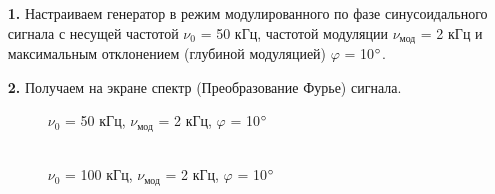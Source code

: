 \documentclass[a4paper,12pt]{article}
\begin{document}
\begin{enumerate}


\item [\textbf{1.}] Настраиваем генератор в режим модулированного по фазе синусоидального сигнала с несущей частотой $\nu_0$ = 50 кГц, частотой модуляции $\nu_\text{мод}$ = 2 кГц и максимальным отклонением (глубиной модуляцией) $\varphi$ = 10$\degree$.

\item [\textbf{2.}] Получаем на экране спектр (Преобразование Фурье) сигнала.

\begin{figure}[h]
\begin{minipage}[h]{0.44\linewidth}
 $\nu_0$ = 50 кГц, $\nu_\text{мод}$ = 2 кГц, $\varphi$ = 10$\degree$  \\
\end{minipage}
\hfill
\begin{minipage}[h]{0.44\linewidth}
 \\  $\nu_0$ = 100 кГц, $\nu_\text{мод}$ = 2 кГц, $\varphi$ = 10$\degree$

\end{minipage}
\end{figure}
\end{enumerate}
\end{document}
